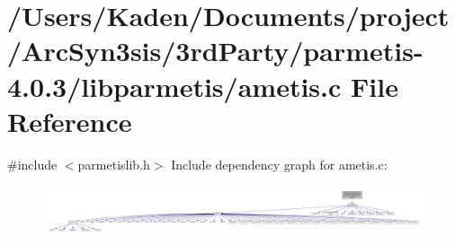\hypertarget{a00338}{}\section{/\+Users/\+Kaden/\+Documents/project/\+Arc\+Syn3sis/3rd\+Party/parmetis-\/4.0.3/libparmetis/ametis.c File Reference}
\label{a00338}
{\ttfamily \#include $<$parmetislib.\+h$>$}\newline
Include dependency graph for ametis.\+c\+:\nopagebreak
\begin{figure}[H]
\begin{center}
\leavevmode
\includegraphics[width=350pt]{a00339}
\end{center}
\end{figure}
